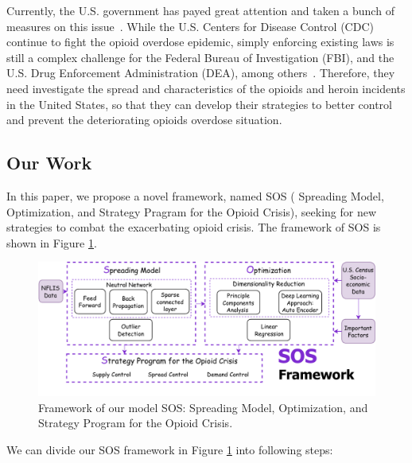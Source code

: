\documentclass{mcmthesis}
\begin{document}
Currently, the U.S. government has payed great attention and taken a bunch of measures on this issue~\cite{CORRIGAN201844}. While the U.S. Centers for Disease Control (CDC) continue to fight the opioid overdose epidemic, simply enforcing existing laws is still a complex challenge for the Federal Bureau of Investigation (FBI), and the U.S. Drug Enforcement Administration (DEA), among others~\cite{intro}. Therefore, they need investigate the spread and characteristics of the opioids and heroin incidents in the United States, so that they can develop their strategies to better control and prevent the deteriorating opioids overdose situation.

\subsection{Our Work}
In this paper, we propose a novel framework, named SOS ( Spreading Model, Optimization, and Strategy Pragram for the Opioid Crisis), seeking for new strategies to combat the exacerbating opioid crisis. The framework of SOS is shown in Figure \ref{Framework}. 

\begin{figure}[htbp]
	\centering 
	\includegraphics[width=1\linewidth]{../figure/framework2.pdf} 
	\caption{Framework of our model SOS: Spreading Model, Optimization, and Strategy Program for the Opioid Crisis.} 
	\label{Framework}  
\end{figure}


We can divide our SOS framework in Figure  \ref{Framework}  into following steps:
\end{document}
